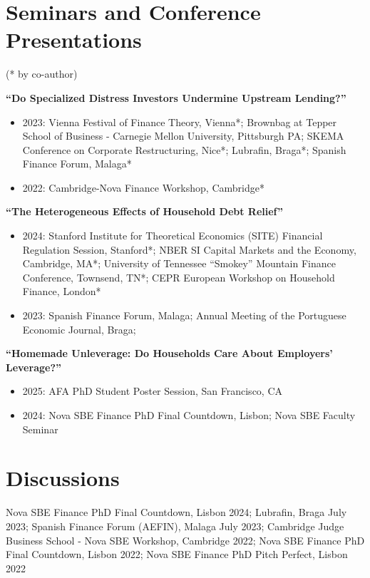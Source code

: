\documentclass[letterpaper]{article}
\newenvironment{itemize*}{
  \begin{list}{}{
    \setlength{\leftmargin}{1.5em}
  }
}{
  \end{list}
}
\begin{document}
\section*{Seminars and Conference Presentations}
\vspace{-0.1in}
(* by co-author)
\begin{itemize*}
\item \textbf{``Do Specialized Distress Investors Undermine Upstream Lending?''}
\begin{itemize}
\item 2023: Vienna Festival of Finance Theory, Vienna*; Brownbag at Tepper School of Business - Carnegie Mellon University, Pittsburgh PA; SKEMA Conference on Corporate Restructuring, Nice*; Lubrafin, Braga*; Spanish Finance Forum, Malaga*
\item 2022: Cambridge-Nova Finance Workshop, Cambridge*
\end{itemize}
\item \textbf{``The Heterogeneous Effects of Household Debt Relief''}
\begin{itemize}
\item 2024: Stanford Institute for Theoretical Economics (SITE) Financial Regulation Session, Stanford*; NBER SI Capital Markets and the Economy, Cambridge, MA*; University of Tennessee ``Smokey'' Mountain Finance Conference, Townsend, TN*; CEPR European Workshop on Household Finance, London*
\item 2023: Spanish Finance Forum, Malaga; Annual Meeting of the Portuguese Economic Journal, Braga; 
\end{itemize}
\item \textbf{``Homemade Unleverage: Do Households Care About Employers' Leverage?''}
\begin{itemize}
\item 2025: AFA PhD Student Poster Session, San Francisco, CA
\item 2024: Nova SBE Finance PhD Final Countdown, Lisbon; Nova SBE Faculty Seminar
\end{itemize}
\end{itemize*}

\section*{Discussions}
\begin{itemize*}
\item Nova SBE Finance PhD Final Countdown, Lisbon 2024; Lubrafin, Braga July 2023; Spanish Finance Forum (AEFIN), Malaga July 2023; Cambridge Judge Business School - Nova SBE Workshop,  Cambridge 2022; Nova SBE Finance PhD Final Countdown, Lisbon 2022; Nova SBE Finance PhD Pitch Perfect, Lisbon 2022
\end{itemize*}
\end{document}
